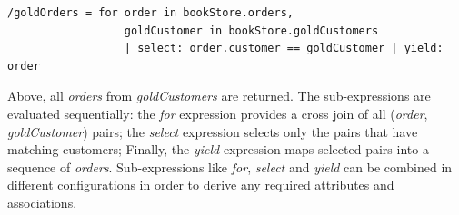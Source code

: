 \verbatimfont{\small}
\begin{verbatim}
/goldOrders = for order in bookStore.orders,
                  goldCustomer in bookStore.goldCustomers
                  | select: order.customer == goldCustomer | yield: order
 \end{verbatim}

Above, all \emph{orders} from \emph{goldCustomers} are returned.
The sub-expressions are evaluated sequentially:
the \emph{for} expression provides a cross join of all (\emph{order}, \emph{goldCustomer}) pairs;
the \emph{select} expression selects only the pairs that have matching customers;
Finally, the \emph{yield} expression maps selected pairs into a sequence of \emph{orders}.
Sub-expressions like \emph{for}, \emph{select} and \emph{yield} can be combined in different configurations
in order to derive any required attributes and associations.
